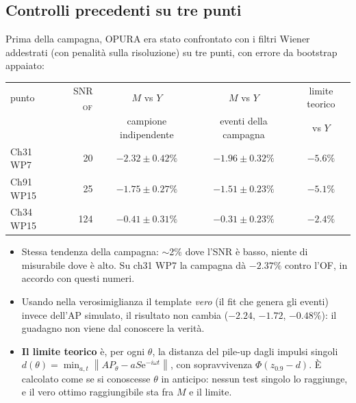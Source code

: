 \documentclass[11pt,a4paper]{article}
\newcommand{\norm}[1]{\left\lVert #1 \right\rVert}
\newcommand{\e}{\mathrm{e}}
\begin{document}
\subsection{Controlli precedenti su tre punti}
Prima della campagna, OPURA era stato confrontato con i filtri Wiener addestrati (con penalità
sulla risoluzione) su tre punti, con errore da bootstrap appaiato:
\begin{center}
\begin{tabular}{lrccc}
\toprule
punto & SNR$_\mathrm{OF}$ & $M$ vs $Y$ & $M$ vs $Y$ & limite teorico \\
      &                   & campione indipendente & eventi della campagna & vs $Y$ \\
\midrule
Ch31 WP7  &  20 & $-2.32 \pm 0.42\%$ & $-1.96 \pm 0.32\%$ & $-5.6\%$ \\
Ch91 WP15 &  25 & $-1.75 \pm 0.27\%$ & $-1.51 \pm 0.23\%$ & $-5.1\%$ \\
Ch34 WP15 & 124 & $-0.41 \pm 0.31\%$ & $-0.31 \pm 0.23\%$ & $-2.4\%$ \\
\bottomrule
\end{tabular}
\end{center}
\begin{itemize}
  \item Stessa tendenza della campagna: $\sim$2\% dove l'SNR è basso, niente di misurabile dove è
    alto. Su ch31 WP7 la campagna dà $-2.37\%$ contro l'OF, in accordo con questi numeri.
  \item Usando nella verosimiglianza il template \emph{vero} (il fit che genera gli eventi) invece
    dell'AP simulato, il risultato non cambia ($-2.24$, $-1.72$, $-0.48\%$): il guadagno non viene
    dal conoscere la verità.
  \item \textbf{Il limite teorico} è, per ogni $\theta$, la distanza del pile-up dagli impulsi
    singoli $d(\theta) = \min_{a,t}\norm{A P_\theta - a S\e^{-i\omega t}}$, con sopravvivenza
    $\Phi(z_{0.9} - d)$. È calcolato come se si conoscesse $\theta$ in anticipo: nessun test singolo
    lo raggiunge, e il vero ottimo raggiungibile sta fra $M$ e il limite.
\end{itemize}

\end{document}
